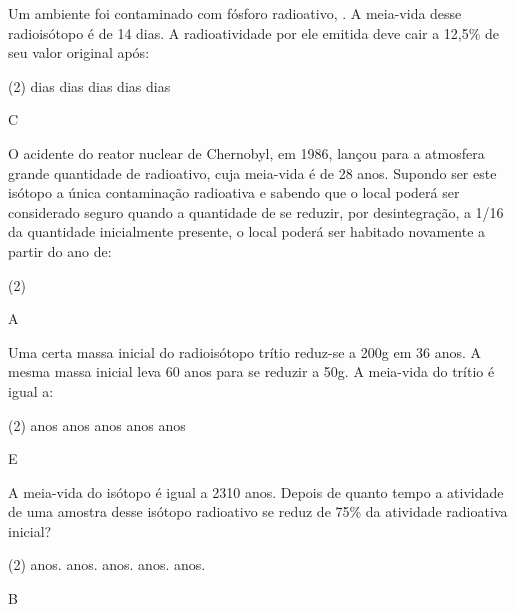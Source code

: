 \documentclass[9 pt]{scrartcl}
\begin{document}
\begin{exercise}[points=1.0]
Um ambiente foi contaminado com fósforo radioativo, . A meia-vida desse radioisótopo é de 14 dias. A radioatividade por ele emitida deve cair a 12,5\% de seu valor original após:

\begin{choice}(2)
 dias
 dias
 dias
 dias
 dias
\end{choice}
\end{exercise}
\begin{solution}
C
\end{solution}





\begin{exercise}[points=1.0]
O acidente do reator nuclear de Chernobyl, em 1986, lançou para a atmosfera grande quantidade de  radioativo, cuja meia-vida é de 28 anos. Supondo ser este isótopo a única contaminação radioativa e sabendo que o local poderá ser considerado seguro quando a quantidade de  se reduzir, por desintegração, a 1/16 da quantidade inicialmente presente, o local poderá ser habitado novamente a partir do ano de:

\begin{choice}(2)
\end{choice}
\end{exercise}
\begin{solution}
A
\end{solution}





\begin{exercise}[points=1.0]
Uma certa massa inicial do radioisótopo trítio reduz-se a 200g em 36 anos. A mesma massa inicial leva 60 anos para se reduzir a 50g.
A meia-vida do trítio é igual a:


\begin{choice}(2)
 anos
 anos
 anos
 anos
 anos
\end{choice}
\end{exercise}
\begin{solution}
E
\end{solution}





\begin{exercise}[points=1.0]
A meia-vida do isótopo  é igual a 2310 anos. Depois de quanto tempo a atividade de uma amostra desse isótopo radioativo se reduz de 75\% da atividade radioativa inicial?

\begin{choice}(2)
 anos.
 anos.
 anos.
 anos.
 anos.
\end{choice}
\end{exercise}
\begin{solution}
B
\end{solution}
\end{document}
